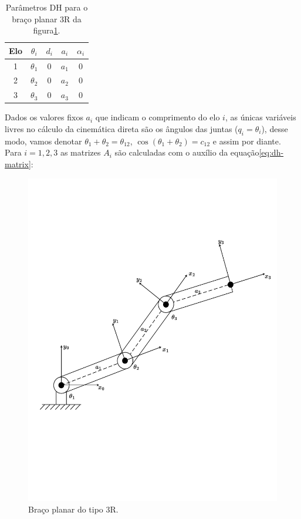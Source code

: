 \begin{table}[htbp]
    \centering
    \begin{tabular}{c c c c c}
        \toprule
        \textbf{Elo} & \(\theta_i\) & \(d_i\) & \(a_i\) & \(\alpha_i\) \\
        \midrule
        1            & \(\theta_1\) & 0       & \(a_1\) & 0            \\
        2            & \(\theta_2\) & 0       & \(a_2\) & 0            \\
        3            & \(\theta_3\) & 0       & \(a_3\) & 0            \\
        \bottomrule
    \end{tabular}
    \caption{Parâmetros DH para o braço planar 3R da figura\ref{fig:3r-planar-arm}.}\label{tab:dh-parameters-planar-arm}
\end{table}

Dados os valores fixos \(a_i\) que indicam o comprimento do elo \(i\), as
únicas variáveis livres no cálculo da cinemática direta são os ângulos das
juntas ($q_i = \theta_i$), desse modo, vamos denotar \(\theta_1 + \theta_2 =
\theta_{12}\), \(\cos(\theta_1 + \theta_2) = c_{12}\) e assim por diante. Para
\(i = 1, 2, 3\) as matrizes $A_i$ são calculadas com o auxílio da equação\ref{eq:dh-matrix}:

\begin{figure}
    \centering
    \includegraphics[width=0.8\linewidth]{export.pdf} %
    \caption{Braço planar do tipo 3R.}\label{fig:3r-planar-arm}
\end{figure}

